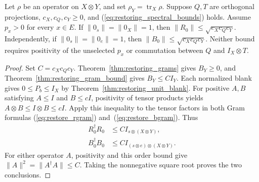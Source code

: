 \begin{theorem}
    \label{thm:restoring_operator_norm}
    \leanok
    Let $\rho$ be an operator on $X\otimes Y$, and set
    $\rho_Y=\operatorname{tr}_X\rho$. Suppose $Q,T$ are orthogonal
    projections, $c_X,c_Q,c_Y\ge0$, and
    (\ref{eq:restoring_spectral_bounds}) holds. Assume $p_x>0$ for
    every $x\in E$.
    If $\|0_s\|=\|0_X\|=1$, then $\|R_0\|\le\sqrt{c_Xc_Qc_Y}$.
    Independently, if $\|0_s\|=\|0_e\|=1$, then
    $\|B_0\|\le\sqrt{c_Xc_Qc_Y}$.
    Neither bound requires positivity of the unselected $p_x$ or
    commutation between $Q$ and $I_X\otimes T$.
\end{theorem}
\begin{proof}\leanok
    Set $C=c_Xc_Qc_Y$. Theorem~\ref{thm:restoring_grams} gives $B_Y\ge0$,
    and Theorem~\ref{thm:restoring_gram_bound} gives $B_Y\le CI_Y$.
    Each normalized blank gives $0\le P_b\le I_X$ by
    Theorem~\ref{thm:restoring_unit_blank}.
    For positive $A,B$ satisfying $A\le I$ and $B\le cI$, positivity
    of tensor products yields $A\otimes B\le I\otimes B\le cI$.
    Apply this inequality to the tensor factors in both Gram formulas
    (\ref{eq:restore_rgram}) and~(\ref{eq:restore_bgram}). Thus
    \begin{align*}
        R_0^\dagger R_0&\le CI_{s\otimes(X\otimes Y)},\\
        B_0^\dagger B_0&\le CI_{(s\otimes e)\otimes(X\otimes Y)}.
    \end{align*}
    For either operator $A$, positivity and this order bound give
    $\|A\|^2=\|A^\dagger A\|\le C$. Taking the nonnegative square
    root proves the two conclusions.
\end{proof}

